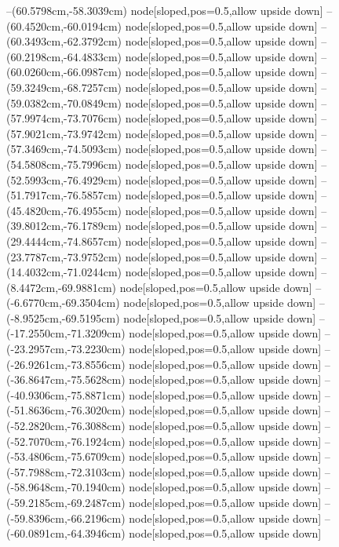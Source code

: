 --(60.5798cm,-58.3039cm) node[sloped,pos=0.5,allow upside down]{\ArrowIn}
--(60.4520cm,-60.0194cm) node[sloped,pos=0.5,allow upside down]{\ArrowIn}
--(60.3493cm,-62.3792cm) node[sloped,pos=0.5,allow upside down]{\ArrowIn}
--(60.2198cm,-64.4833cm) node[sloped,pos=0.5,allow upside down]{\ArrowIn}
--(60.0260cm,-66.0987cm) node[sloped,pos=0.5,allow upside down]{\ArrowIn}
--(59.3249cm,-68.7257cm) node[sloped,pos=0.5,allow upside down]{\ArrowIn}
--(59.0382cm,-70.0849cm) node[sloped,pos=0.5,allow upside down]{\ArrowIn}
--(57.9974cm,-73.7076cm) node[sloped,pos=0.5,allow upside down]{\ArrowIn}
--(57.9021cm,-73.9742cm) node[sloped,pos=0.5,allow upside down]{\arrowIn}
--(57.3469cm,-74.5093cm) node[sloped,pos=0.5,allow upside down]{\arrowIn}
--(54.5808cm,-75.7996cm) node[sloped,pos=0.5,allow upside down]{\ArrowIn}
--(52.5993cm,-76.4929cm) node[sloped,pos=0.5,allow upside down]{\ArrowIn}
--(51.7917cm,-76.5857cm) node[sloped,pos=0.5,allow upside down]{\arrowIn}
--(45.4820cm,-76.4955cm) node[sloped,pos=0.5,allow upside down]{\ArrowIn}
--(39.8012cm,-76.1789cm) node[sloped,pos=0.5,allow upside down]{\ArrowIn}
--(29.4444cm,-74.8657cm) node[sloped,pos=0.5,allow upside down]{\ArrowIn}
--(23.7787cm,-73.9752cm) node[sloped,pos=0.5,allow upside down]{\ArrowIn}
--(14.4032cm,-71.0244cm) node[sloped,pos=0.5,allow upside down]{\ArrowIn}
--(8.4472cm,-69.9881cm) node[sloped,pos=0.5,allow upside down]{\ArrowIn}
--(-6.6770cm,-69.3504cm) node[sloped,pos=0.5,allow upside down]{\ArrowIn}
--(-8.9525cm,-69.5195cm) node[sloped,pos=0.5,allow upside down]{\ArrowIn}
--(-17.2550cm,-71.3209cm) node[sloped,pos=0.5,allow upside down]{\ArrowIn}
--(-23.2957cm,-73.2230cm) node[sloped,pos=0.5,allow upside down]{\ArrowIn}
--(-26.9261cm,-73.8556cm) node[sloped,pos=0.5,allow upside down]{\ArrowIn}
--(-36.8647cm,-75.5628cm) node[sloped,pos=0.5,allow upside down]{\ArrowIn}
--(-40.9306cm,-75.8871cm) node[sloped,pos=0.5,allow upside down]{\ArrowIn}
--(-51.8636cm,-76.3020cm) node[sloped,pos=0.5,allow upside down]{\ArrowIn}
--(-52.2820cm,-76.3088cm) node[sloped,pos=0.5,allow upside down]{\arrowIn}
--(-52.7070cm,-76.1924cm) node[sloped,pos=0.5,allow upside down]{\arrowIn}
--(-53.4806cm,-75.6709cm) node[sloped,pos=0.5,allow upside down]{\arrowIn}
--(-57.7988cm,-72.3103cm) node[sloped,pos=0.5,allow upside down]{\ArrowIn}
--(-58.9648cm,-70.1940cm) node[sloped,pos=0.5,allow upside down]{\ArrowIn}
--(-59.2185cm,-69.2487cm) node[sloped,pos=0.5,allow upside down]{\arrowIn}
--(-59.8396cm,-66.2196cm) node[sloped,pos=0.5,allow upside down]{\ArrowIn}
--(-60.0891cm,-64.3946cm) node[sloped,pos=0.5,allow upside down]{\ArrowIn}
